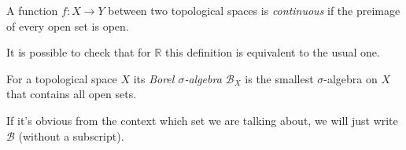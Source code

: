 \begin{definition}
    A function $f : X \to Y$ between two topological spaces is \textit{continuous} if
    the preimage of every open set is open.
\end{definition}
\begin{remark}
    It is possible to check that for $\mathbb{R}$ this definition is
    equivalent to the usual one.
\end{remark}

\begin{definition}
    For a topological space $X$ its \textit{Borel $\sigma$-algebra $\mathcal{B}_X$}
    is the smallest $\sigma$-algebra on $X$ that contains all open sets. 
\end{definition}
\begin{remark}
    If it's obvious from the context which set we are talking about,
    we will just write $\mathcal{B}$ (without a subscript).
\end{remark}

